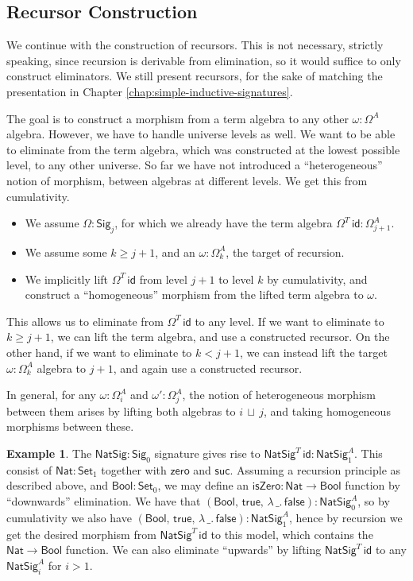 \documentclass[12pt,a4paper,twoside,openany]{book}
\theoremstyle{remark}
\theoremstyle{definition}
\newtheorem{myexample}{Example}
\theoremstyle{theorem}
\newcommand{\ms}[1]{\mathsf{#1}}
\newcommand{\zero}{\ms{zero}}
\newcommand{\suc}{\ms{suc}}
\newcommand{\id}{\mathsf{id}}
\newcommand{\Set}{\mathsf{Set}}
\newcommand{\Sig}{\mathsf{Sig}}
\newcommand{\Nat}{\ms{Nat}}
\newcommand{\Bool}{\ms{Bool}}
\newcommand{\true}{\ms{true}}
\newcommand{\false}{\ms{false}}
\newcommand{\lub}{\,\sqcup\,}
\begin{document}
\subsection{Recursor Construction}

We continue with the construction of recursors. This is not necessary, strictly
speaking, since recursion is derivable from elimination, so it would suffice to
only construct eliminators. We still present recursors, for the sake of matching
the presentation in Chapter \ref{chap:simple-inductive-signatures}.

The goal is to construct a morphism from a term algebra to any other $\omega :
\Omega^A$ algebra. However, we have to handle universe levels as well. We want
to be able to eliminate from the term algebra, which was constructed at the
lowest possible level, to any other universe. So far we have not introduced a
``heterogeneous'' notion of morphism, between algebras at different levels. We
get this from cumulativity.
\begin{itemize}
  \item We assume $\Omega : \Sig_j$, for which we already have the term algebra $\Omega^T\,\id : \Omega^A_{j+1}$.
  \item We assume some $k \geq j + 1$, and an $\omega : \Omega^A_{k}$, the target of recursion.
  \item We implicitly lift $\Omega^T\,\id$ from level $j + 1$ to level $k$ by cumulativity, and construct
        a ``homogeneous'' morphism from the lifted term algebra to $\omega$.
\end{itemize}
This allows us to eliminate from $\Omega^T\,\id$ to any level. If we want to
eliminate to $k \geq j + 1$, we can lift the term algebra, and use a constructed
recursor. On the other hand, if we want to eliminate to $k < j + 1$, we can
instead lift the target $\omega : \Omega^A_{k}$ algebra to $j + 1$, and again
use a constructed recursor.

In general, for any $\omega : \Omega^A_{i}$ and $\omega' : \Omega^A_{j}$, the
notion of heterogeneous morphism between them arises by lifting both algebras to
$i \lub j$, and taking homogeneous morphisms between these.

\begin{myexample}
The $\ms{NatSig} : \Sig_0$ signature gives rise to $\ms{NatSig}^T\,\id :
\ms{NatSig}^A_1$. This consist of $\ms{Nat} : \Set_1$ together with $\zero$ and
$\suc$. Assuming a recursion principle as described above, and $\Bool : \Set_0$,
we may define an $\ms{isZero} : \Nat \to \Bool$ function by ``downwards''
elimination.  We have that $(\Bool,\,\true,\,\lambda\,\_.\,\false) :
\ms{NatSig}^A_0$, so by cumulativity we also have
$(\Bool,\,\true,\,\lambda\,\_.\,\false) : \ms{NatSig}^A_1$, hence by recursion
we get the desired morphism from $\ms{NatSig}^T\,\id$ to this model, which
contains the $\Nat \to \Bool$ function. We can also eliminate ``upwards'' by
lifting $\ms{NatSig}^T\,\id$ to any $\ms{NatSig}^A_i$ for $i > 1$.
\end{myexample}
\end{document}
